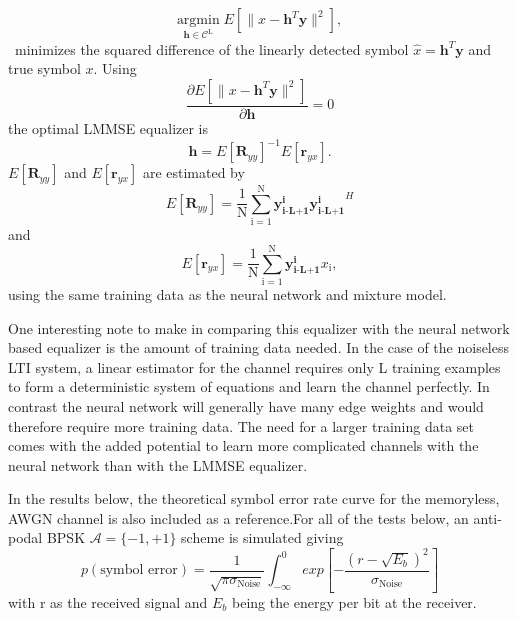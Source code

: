 \begin{equation*}\label{mmse}
\underset{\mathbf{\mathbf{h}} \in \textit{$\mathcal{C}^{\text{L}}$}}{\text{argmin}} \;
 E[\|x-\mathbf{h}^T\mathbf{y}\|^2],
\end{equation*}\
minimizes the squared difference of the linearly detected symbol $\hat{x}= \mathbf{h}^T\mathbf{y}$ and true symbol $x$.
Using
\begin{equation*}\label{mmse}
\frac{\partial  E[\|x-\mathbf{h}^T\mathbf{y}\|^2]}{\partial \mathbf{h} } = 0
\end{equation*}
the optimal LMMSE equalizer is \cite{proakis1988introduction}
\begin{equation*}\label{mmse}
\mathbf{h} = E[\mathbf{R}_{yy}]^{-1}E[\mathbf{r}_{yx}].
\end{equation*}
$E[\mathbf{R}_{yy}]$ and $E[\mathbf{r}_{yx}]$ are estimated by
\begin{equation*}\label{mmse}
 E[\mathbf{R}_{yy}]= \frac{1}{\mathrm{N}}\sum_{\mathrm{i=1}}^{\mathrm{N}}
\mathbf{y^{\text{i}}_{\text{i-L+1}}}\mathbf{y^{\text{i}}_{\text{i-L+1}}}^H
 \end{equation*}
 and
\begin{equation*}\label{mmse}
E[\mathbf{r}_{yx}]= \frac{1}{\mathrm{N}}\sum_{\mathrm{i=1}}^{\mathrm{N}}
\mathbf{y^{\text{i}}_{\text{i-L+1}}}x_{\text{i}},
 \end{equation*}
 using the same training data as the neural network and mixture model. 
 
\par
One interesting note to make in comparing this equalizer with the neural network based equalizer is the amount of training data needed. In the case of the noiseless LTI system, a linear estimator for the channel requires only L training examples to form a deterministic system of equations and learn the channel perfectly. In contrast the neural network will generally have many edge weights and would therefore require more training data. The need for a larger training data set comes with the added potential to learn more complicated channels with the neural network than with the LMMSE equalizer.
 
\par
In the results below, the theoretical symbol error rate curve for the  memoryless, AWGN channel is also included as a reference.For all of the tests below, an anti-podal BPSK $\mathcal{A}= \{-1, +1\}$ scheme is simulated giving  \cite{proakis1988introduction}
\begin{equation*}\label{mmse}
p(\text{symbol error}) = \frac{1}{\sqrt{\pi \sigma_{\text{Noise}}}}
\int_{-\infty}^{0}exp\left[-\frac{(r-\sqrt{E_b})^2}{\sigma_{\text{Noise}}} \right]
 \end{equation*}
with r as the received signal and $E_b$ being the energy per bit at the receiver. 


